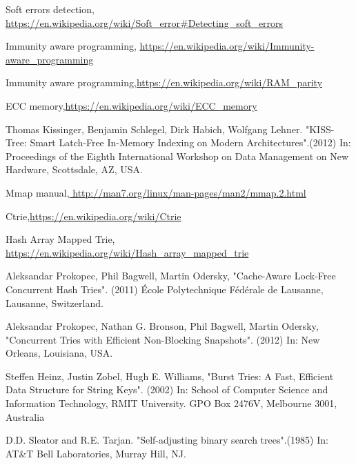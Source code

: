 \documentclass{report}
\begin{document}
\begin{thebibliography}{1}
 Soft errors detection, \url{https://en.wikipedia.org/wiki/Soft_error#Detecting_soft_errors}

 Immunity aware programming, \url{https://en.wikipedia.org/wiki/Immunity-aware_programming}


Immunity aware programming,\url{https://en.wikipedia.org/wiki/RAM_parity}

 ECC memory,\url{https://en.wikipedia.org/wiki/ECC_memory}

 Thomas Kissinger, Benjamin Schlegel, Dirk Habich, Wolfgang Lehner. "KISS-Tree: Smart Latch-Free In-Memory Indexing on Modern Architectures".(2012) In: Proceedings of the Eighth International Workshop on Data Management on New Hardware, Scottsdale, AZ, USA.
 
Mmap manual,\url{ http://man7.org/linux/man-pages/man2/mmap.2.html}

 Ctrie,\url{https://en.wikipedia.org/wiki/Ctrie}

Hash Array Mapped Trie, \url{https://en.wikipedia.org/wiki/Hash_array_mapped_trie}

Aleksandar Prokopec, Phil Bagwell, Martin Odersky, "Cache-Aware Lock-Free Concurrent Hash Tries". (2011) École Polytechnique Fédérale de Lausanne, Lausanne, Switzerland.

Aleksandar Prokopec, Nathan G. Bronson, Phil Bagwell, Martin Odersky, "Concurrent Tries with Efficient Non-Blocking Snapshots". (2012) In: New Orleans, Louisiana, USA.

Steffen Heinz, Justin Zobel, Hugh E. Williams, "Burst Tries: A Fast, Efficient Data Structure for String Keys". (2002) In: School of Computer Science and Information Technology, RMIT University.
GPO Box 2476V, Melbourne 3001, Australia

 D.D. Sleator and R.E. Tarjan. "Self-adjusting binary search trees".(1985) In: AT\&T Bell Laboratories, Murray Hill, NJ. 

\end{thebibliography}
\end{document}
